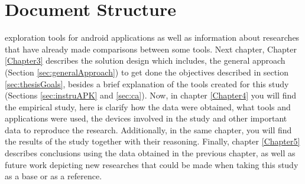 \section{Document Structure}

exploration tools for android applications as well as information about researches that have already made comparisons between some tools. Next chapter, Chapter \ref{Chapter3} describes the solution design which includes, the general approach (Section \ref{sec:generalApproach}) to get done the objectives described in section \ref{sec:thesisGoals}, besides a brief explanation of the tools created for this study (Sections \ref{sec:instruAPK} and \ref{sec:ca}). Now, in chapter \ref{Chapter4} you will find the empirical study, here is clarify how the data were obtained, what tools and applications were used, the devices involved in the study and other important data to reproduce the research. Additionally, in the same chapter, you will find the results of the study together with their reasoning. Finally, chapter \ref{Chapter5} describes conclusions using the data obtained in the previous chapter, as well as future work depicting new researches that could be made when taking this study as a base or as a reference.